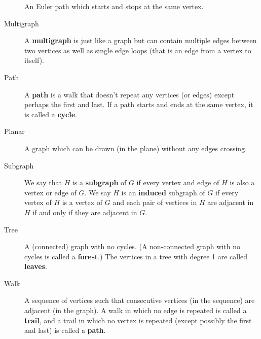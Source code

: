 \documentclass[11pt,]{book}
\newcommand{\terminology}[1]{\textbf{#1}}
\theoremstyle{ptxplainnotitle}
\theoremstyle{ptxplaintitle}
\theoremstyle{ptxdefinitionnotitle}
\theoremstyle{ptxdefinitiontitle}
\theoremstyle{ptxdefinitionnotitle}
\theoremstyle{ptxdefinitiontitle}
\theoremstyle{ptxdefinitionnotitle}
\theoremstyle{ptxdefinitiontitle}
\theoremstyle{ptxdefinitiontitlenonumber}
\theoremstyle{ptxdefinitiontitlenonumber}
\numberwithin{equation}{chapter}
\begin{document}
\begin{description}
 An Euler path which starts and stops at the same vertex.%
\item[{Multigraph}]\hypertarget{li-1182}{}\hypertarget{p-2544}{}%
 A \terminology{multigraph} is just like a graph but can contain multiple edges between two vertices as well as single edge loops (that is an edge from a vertex to itself).%
\item[{Path}]\hypertarget{li-1183}{}\hypertarget{p-2545}{}%
A \terminology{path} is a walk that doesn't repeat any vertices (or edges) except perhaps the first and last.  If a path starts and ends at the same vertex, it is called a \terminology{cycle}.%
\item[{Planar}]\hypertarget{li-1184}{}\hypertarget{p-2546}{}%
 A graph which can be drawn (in the plane) without any edges crossing.%
\item[{Subgraph}]\hypertarget{li-1185}{}\hypertarget{p-2547}{}%
 We say that \(H\) is a \terminology{subgraph} of \(G\) if every vertex and edge of \(H\) is also a vertex or edge of \(G\). We say \(H\) is an \terminology{induced} subgraph of \(G\) if every vertex of \(H\) is a vertex of \(G\) and each pair of vertices in \(H\) are adjacent in \(H\) if and only if they are adjacent in \(G\).%
\item[{Tree}]\hypertarget{li-1186}{}\hypertarget{p-2548}{}%
 A (connected) graph with no cycles. (A non-connected graph with no cycles is called a \terminology{forest}.) The vertices in a tree with degree 1 are called \terminology{leaves}.%
\item[{Walk}]\hypertarget{li-1187}{}\hypertarget{p-2549}{}%
 A sequence of vertices such that consecutive vertices (in the sequence) are adjacent (in the graph). A walk in which no edge is repeated is called a \terminology{trail}, and a trail in which no vertex is repeated (except possibly the first and last) is called a \terminology{path}.%
\end{description}
%
\typeout{************************************************}
\typeout{************************************************}
\end{document}
